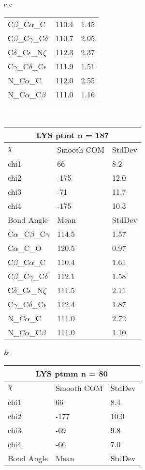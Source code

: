 \begin{longtable}{ c c }
\begin{tabular}{ l l l }
  C$\beta$\_C$\alpha$\_C & 110.4 & 1.45\\
  C$\beta$\_C$\gamma$\_C$\delta$ & 110.7 & 2.05\\
  C$\delta$\_C$\epsilon$\_N$\zeta$ & 112.3 & 2.37\\
  C$\gamma$\_C$\delta$\_C$\epsilon$ & 111.9 & 1.51\\
  N\_C$\alpha$\_C & 112.0 & 2.55\\
  N\_C$\alpha$\_C$\beta$ & 111.0 & 1.16\\
  \bottomrule
  \end{tabular}
  \\
  \begin{tabular}{ l l l }
  \toprule
  \multicolumn{3}{c}{LYS \textbf{ptmt} n = 187} \\ \toprule
  $\chi$       & Smooth COM & StdDev \\ \midrule
  chi1 & 66 & 8.2 \\ 
  chi2 & -175 & 12.0 \\ 
  chi3 & -71 & 11.7 \\ 
  chi4 & -175 & 10.3 \\ \midrule
  Bond Angle   & Mean     & StdDev \\ \midrule
  C$\alpha$\_C$\beta$\_C$\gamma$ & 114.5 & 1.57\\
  C$\alpha$\_C\_O & 120.5 & 0.97\\
  C$\beta$\_C$\alpha$\_C & 110.4 & 1.61\\
  C$\beta$\_C$\gamma$\_C$\delta$ & 112.1 & 1.58\\
  C$\delta$\_C$\epsilon$\_N$\zeta$ & 111.5 & 2.11\\
  C$\gamma$\_C$\delta$\_C$\epsilon$ & 112.4 & 1.87\\
  N\_C$\alpha$\_C & 111.0 & 2.72\\
  N\_C$\alpha$\_C$\beta$ & 111.0 & 1.10\\
  \bottomrule
  \end{tabular}
  &
  \begin{tabular}{ l l l }
  \toprule
  \multicolumn{3}{c}{LYS \textbf{ptmm} n = 80} \\ \toprule
  $\chi$       & Smooth COM & StdDev \\ \midrule
  chi1 & 66 & 8.4 \\ 
  chi2 & -177 & 10.0 \\ 
  chi3 & -69 & 9.8 \\ 
  chi4 & -66 & 7.0 \\ \midrule
  Bond Angle   & Mean     & StdDev \\ \midrule

\end{tabular}
\end{longtable}
